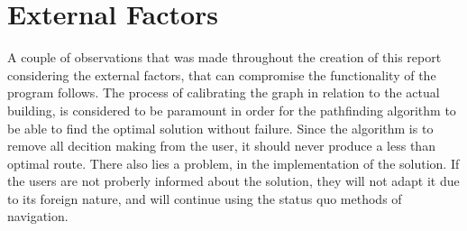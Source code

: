 \section{External Factors}

A couple of observations that was made throughout the creation of this report considering the external factors, that can compromise the functionality of the program follows. The process of calibrating the graph in relation to the actual building, is considered to be paramount in order for the pathfinding algorithm to be able to find the optimal solution without failure. Since the algorithm is to remove all decition making from the user, it should never produce a less than optimal route. There also lies a problem, in the implementation of the solution. If the users are not proberly informed about the solution, they will not adapt it due to its foreign nature, and will continue using the status quo methods of navigation.